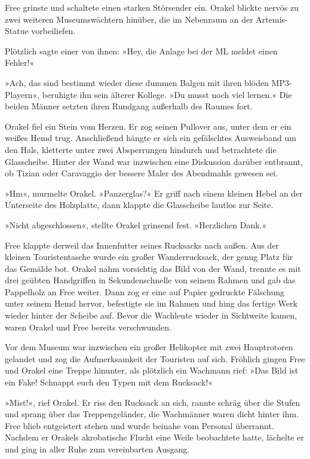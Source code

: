 Free grinste und schaltete einen starken Störsender ein. Orakel blickte nervös zu zwei weiteren Museumswächtern hinüber, die im Nebenraum an der Artemis-Statue vorbeiliefen.

Plötzlich sagte einer von ihnen: »Hey, die Anlage bei der ML meldet einen Fehler!«

»Ach, das sind bestimmt wieder diese dummen Balgen mit ihren blöden MP3-Playern«, beruhigte ihn sein älterer Kollege. »Du musst noch viel lernen.« Die beiden Männer setzten ihren Rundgang außerhalb des Raumes fort.

Orakel fiel ein Stein vom Herzen. Er zog seinen Pullover aus, unter dem er ein weißes Hemd trug. Anschließend hängte er sich ein gefälschtes Ausweisband um den Hals, kletterte unter zwei Absperrungen hindurch und betrachtete die Glasscheibe. Hinter der Wand war inzwischen eine Diskussion darüber entbrannt, ob Tizian oder Caravaggio der bessere Maler des Abendmahls gewesen sei.

»Hm«, murmelte Orakel. »Panzerglas?« Er griff nach einem kleinen Hebel an der Unterseite des Holzplatte, dann klappte die Glasscheibe lautlos zur Seite.

»Nicht abgeschlossen«, stellte Orakel grinsend fest. »Herzlichen Dank.«

Free klappte derweil das Innenfutter seines Rucksacks nach außen. Aus der kleinen Touristentasche wurde ein großer Wanderrucksack, der genug Platz für das Gemälde bot. Orakel nahm vorsichtig das Bild von der Wand, trennte es mit drei geübten Handgriffen in Sekundenschnelle von seinem Rahmen und gab das Pappelholz an Free weiter. Dann zog er eine auf Papier gedruckte Fälschung unter seinem Hemd hervor, befestigte sie im Rahmen und hing das fertige Werk wieder hinter der Scheibe auf. Bevor die Wachleute wieder in Sichtweite kamen, waren Orakel und Free bereits verschwunden.

Vor dem Museum war inzwischen ein großer Helikopter mit zwei Hauptrotoren gelandet und zog die Aufmerksamkeit der Touristen auf sich. Fröhlich gingen Free und Orakel eine Treppe hinunter, als plötzlich ein Wachmann rief: »Das Bild ist ein Fake! Schnappt euch den Typen mit dem Rucksack!«

»Mist!«, rief Orakel. Er riss den Rucksack an sich, rannte schräg über die Stufen und sprang über das Treppengeländer, die Wachmänner waren dicht hinter ihm. Free blieb entgeistert stehen und wurde beinahe vom Personal überrannt. Nachdem er Orakels akrobatische Flucht eine Weile beobachtete hatte, lächelte er und ging in aller Ruhe zum vereinbarten Ausgang.


